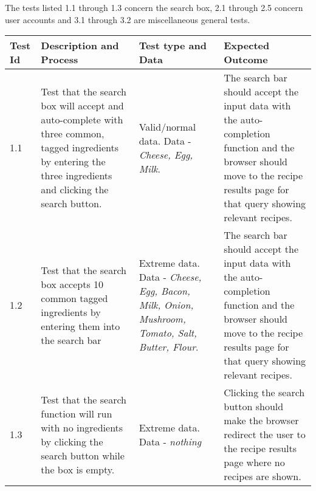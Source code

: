 The tests listed 1.1 through 1.3 concern the search box, 2.1 through 2.5 concern user accounts and 3.1 through 3.2 are miscellaneous general tests. 

    \begin{tabular}{ | l | p{4cm} |  p{4cm} | p{4cm} |}
    \hline
    Test Id	& Description and Process &	Test type and Data &	Expected Outcome \\ \hline
    
    1.1 &	Test that the search box will accept and auto-complete with three common, tagged ingredients by entering the three ingredients and clicking the search button. &	Valid/normal data.
Data - \emph{Cheese, Egg, Milk}. &	The search bar should accept the input data with the auto-completion function and the browser should move to the recipe results page for that query showing relevant recipes.\\ \hline


1.2	& Test that the search box accepts 10 common tagged ingredients by entering them into the search bar&	Extreme data.
Data - \emph{Cheese, Egg, Bacon, Milk, Onion, Mushroom, Tomato, Salt, Butter, Flour}. &	The search bar should accept the input data with the auto-completion function and the browser should move to the recipe results page for that query showing relevant recipes.\\ \hline

1.3	& Test that the search function will run with no ingredients by clicking the search button while the box is empty. &	Extreme data.
Data - \emph{nothing} &	Clicking the search button should make the browser redirect the user to the recipe results page where no recipes are shown.\\
    \hline
    \end{tabular}
    
